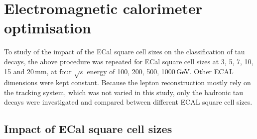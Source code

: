 \documentclass[a4paper,11pt]{article}
\newcommand{\rootS}{\ensuremath{\sqrt{s}} }
\begin{document}
\section{Electromagnetic calorimeter optimisation}

To study of the impact of the ECal square cell sizes on the classification of tau decays, the above procedure was repeated for ECal square cell sizes at 3, 5, 7, 10, 15 and 20\,mm, at four  \rootS energy of 100, 200, 500, 1000\,GeV. Other ECAL dimensions were kept constant. Because the lepton reconstruction mostly rely on the tracking system, which was not varied in this study, only the  hadronic tau decays were investigated and compared between different ECAL square cell sizes.

\subsection{Impact of ECal square cell sizes}
\end{document}
